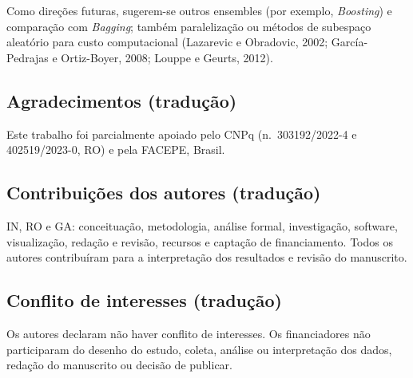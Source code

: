 \documentclass[11pt,a4paper]{article}
\begin{document}
Como direções futuras, sugerem-se outros ensembles (por exemplo, \emph{Boosting}) e comparação com \emph{Bagging}; também paralelização ou métodos de subespaço aleatório para custo computacional (Lazarevic e Obradovic, 2002; García-Pedrajas e Ortiz-Boyer, 2008; Louppe e Geurts, 2012).

\subsection*{Agradecimentos (tradução)}

Este trabalho foi parcialmente apoiado pelo CNPq (n.\ 303192/2022-4 e 402519/2023-0, RO) e pela FACEPE, Brasil.

\subsection*{Contribuições dos autores (tradução)}

IN, RO e GA: conceituação, metodologia, análise formal, investigação, software, visualização, redação e revisão, recursos e captação de financiamento. Todos os autores contribuíram para a interpretação dos resultados e revisão do manuscrito.

\subsection*{Conflito de interesses (tradução)}

Os autores declaram não haver conflito de interesses. Os financiadores não participaram do desenho do estudo, coleta, análise ou interpretação dos dados, redação do manuscrito ou decisão de publicar.
\end{document}
